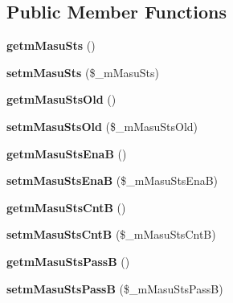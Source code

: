 \subsection*{Public Member Functions}
\begin{DoxyCompactItemize}
\item 
\mbox{\label{class_reversi_a995fd4e134f3161d0d67caddd362ddda}} 
{\bfseries getm\+Masu\+Sts} ()
\item 
\mbox{\label{class_reversi_abfd5a55ea9efdd26a609557b59c0d12e}} 
{\bfseries setm\+Masu\+Sts} (\$\+\_\+m\+Masu\+Sts)
\item 
\mbox{\label{class_reversi_a32328d1f1bf56d2e84141a8c9804f359}} 
{\bfseries getm\+Masu\+Sts\+Old} ()
\item 
\mbox{\label{class_reversi_a71900505df416c91732e8e0196127b94}} 
{\bfseries setm\+Masu\+Sts\+Old} (\$\+\_\+m\+Masu\+Sts\+Old)
\item 
\mbox{\label{class_reversi_aff36ab36553b866ca2a8be3fdf3bf2f0}} 
{\bfseries getm\+Masu\+Sts\+EnaB} ()
\item 
\mbox{\label{class_reversi_a96a62c362d81a5861eb5e875de2376f0}} 
{\bfseries setm\+Masu\+Sts\+EnaB} (\$\+\_\+m\+Masu\+Sts\+EnaB)
\item 
\mbox{\label{class_reversi_ae26e602c710657395eb489795fd0ccb7}} 
{\bfseries getm\+Masu\+Sts\+CntB} ()
\item 
\mbox{\label{class_reversi_a006a77defc43d4195d30950666710e7d}} 
{\bfseries setm\+Masu\+Sts\+CntB} (\$\+\_\+m\+Masu\+Sts\+CntB)
\item 
\mbox{\label{class_reversi_afc5e8bfd7ef5cfa8d4b93ab0146b1bd6}} 
{\bfseries getm\+Masu\+Sts\+PassB} ()
\item 
\mbox{\label{class_reversi_a426ce5e0ef8cd875b75abe23c0d14a14}} 
{\bfseries setm\+Masu\+Sts\+PassB} (\$\+\_\+m\+Masu\+Sts\+PassB)
\item 
\mbox{\label{class_reversi_aba5dc09ce4db9c40e13575e5b10f3ea7}} 

\end{DoxyCompactItemize}

